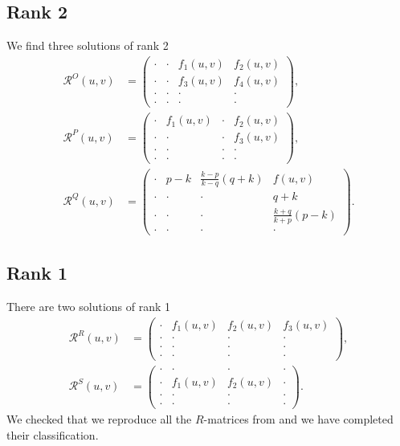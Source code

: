\documentclass{article}
\begin{document}
\subsection{Rank 2}
We find three solutions of rank 2
\begin{align}
    \mathcal{R}^O(u,v)&=\begin{pmatrix}
\cdot & \cdot &f_1(u,v) & f_2(u,v) \\
\cdot & \cdot & f_3(u,v) & f_4(u,v) \\
 \cdot & \cdot  & \cdot & \cdot \\
 \cdot & \cdot & \cdot & \cdot
    \end{pmatrix},\\
    \mathcal{R}^P(u,v)&=\begin{pmatrix}
       \cdot&f_1(u,v)&\cdot&f_2(u,v)\\
        \cdot&\cdot&\cdot&f_3(u,v)\\
        \cdot&\cdot&\cdot&\cdot\\
        \cdot&\cdot&\cdot&\cdot
    \end{pmatrix},\\
      \mathcal{R}^Q(u,v)&=\begin{pmatrix}
       \cdot&p-k&\frac{k-p}{k-q}(q+k)&f(u,v)\\
        \cdot&\cdot&\cdot&q+k\\
        \cdot&\cdot&\cdot&\frac{k+q}{k+p}(p-k)\\
        \cdot&\cdot&\cdot&\cdot
    \end{pmatrix}.
\end{align}

\subsection{Rank 1}
There are two solutions of rank 1
\begin{align}
    \mathcal{R}^R(u,v)&=\begin{pmatrix}
       \cdot&f_1(u,v)&f_2(u,v)&f_3(u,v)\\
        \cdot&\cdot&\cdot&\cdot\\
        \cdot&\cdot&\cdot&\cdot\\
        \cdot&\cdot&\cdot&\cdot
    \end{pmatrix},\\
    \mathcal{R}^S(u,v)&=\begin{pmatrix}
       \cdot&\cdot&\cdot&\cdot\\
        \cdot&f_1(u,v)&f_2(u,v)&\cdot\\
        \cdot&\cdot&\cdot&\cdot\\
        \cdot&\cdot&\cdot&\cdot
    \end{pmatrix}.
\end{align}
We checked that we reproduce all the $R$-matrices from \cite{Garkun:2024jnp} and we have completed their classification.
\end{document}
